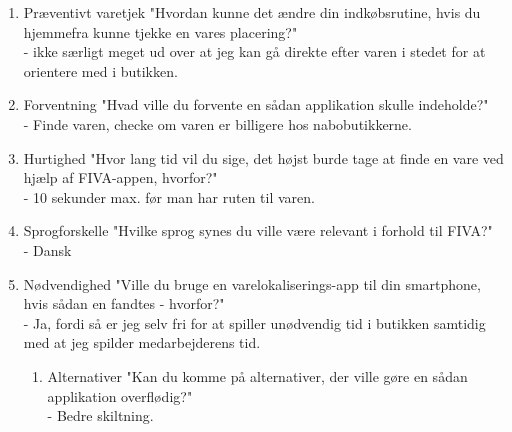 \begin{enumerate}
\begin{enumerate}
\item Præventivt varetjek "Hvordan kunne det ændre din indkøbsrutine, hvis du hjemmefra kunne tjekke en vares placering?"\\
  - ikke særligt meget ud over at jeg kan gå direkte efter varen i stedet for at orientere med i butikken.
\item Forventning "Hvad ville du forvente en sådan applikation skulle indeholde?"\\
  - Finde varen, checke om varen er billigere hos nabobutikkerne. 
\item Hurtighed	"Hvor lang tid vil du sige, det højst burde tage at finde en vare ved hjælp af FIVA-appen, hvorfor?"\\
  - 10 sekunder max. før man har ruten til varen.
\item Sprogforskelle "Hvilke sprog synes du ville være relevant i forhold til FIVA?"\\
  - Dansk
\item Nødvendighed "Ville du bruge en varelokaliserings-app til din smartphone, hvis sådan en fandtes - hvorfor?"\\
  - Ja, fordi så er jeg selv fri for at spiller unødvendig tid i butikken samtidig med at jeg spilder medarbejderens tid.
\begin{enumerate}
\item Alternativer "Kan du komme på alternativer, der ville gøre en sådan applikation overflødig?"\\
  - Bedre skiltning.
\end{enumerate}


\end{enumerate}
\end{enumerate}
